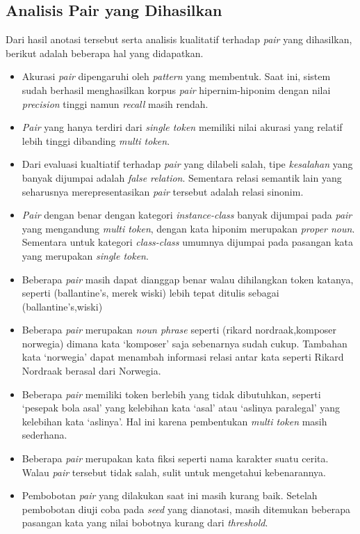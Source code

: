 \subsection{Analisis Pair yang Dihasilkan}
Dari hasil anotasi tersebut serta analisis kualitatif terhadap \textit{pair} yang dihasilkan, berikut adalah beberapa hal yang didapatkan.
\begin{itemize} 
  \item Akurasi \textit{pair} dipengaruhi oleh \textit{pattern} yang membentuk. Saat ini, sistem sudah berhasil menghasilkan korpus \textit{pair} hipernim-hiponim dengan nilai \textit{precision} tinggi namun \textit{recall} masih rendah.
  \item \textit{Pair} yang hanya terdiri dari \textit{single token} memiliki nilai akurasi yang relatif lebih tinggi dibanding \textit{multi token}.
  \item Dari evaluasi kualtiatif terhadap \textit{pair} yang dilabeli salah, tipe \textit{kesalahan} yang banyak dijumpai adalah \textit{false relation}. Sementara relasi semantik lain yang seharusnya merepresentasikan \textit{pair} tersebut adalah relasi sinonim.
  \item \textit{Pair} dengan benar dengan kategori \textit{instance-class} banyak dijumpai pada \textit{pair} yang mengandung \textit{multi token}, dengan kata hiponim merupakan \textit{proper noun}. Sementara untuk kategori \textit{class-class} umumnya dijumpai pada pasangan kata yang merupakan \textit{single token}. 
  \item Beberapa \textit{pair} masih dapat dianggap benar walau dihilangkan token katanya, seperti (ballantine's, merek wiski) lebih tepat ditulis sebagai (ballantine's,wiski)
  \item Beberapa \textit{pair} merupakan \textit{noun phrase} seperti (rikard nordraak,komposer norwegia) dimana kata `komposer' saja sebenarnya sudah cukup. Tambahan kata `norwegia' dapat menambah informasi relasi antar kata seperti Rikard Nordraak berasal dari Norwegia.
  \item Beberapa \textit{pair} memiliki token berlebih yang tidak dibutuhkan, seperti `pesepak bola asal' yang kelebihan kata `asal' atau `aslinya paralegal' yang kelebihan kata `aslinya'. Hal ini karena pembentukan \textit{multi token} masih sederhana. 
  \item Beberapa \textit{pair} merupakan kata fiksi seperti nama karakter suatu cerita. Walau \textit{pair} tersebut tidak salah, sulit untuk mengetahui kebenarannya.
  \item Pembobotan \textit{pair} yang dilakukan saat ini masih kurang baik. Setelah pembobotan diuji coba pada \textit{seed} yang dianotasi, masih ditemukan beberapa pasangan kata yang nilai bobotnya kurang dari \textit{threshold}. 
\end{itemize}

